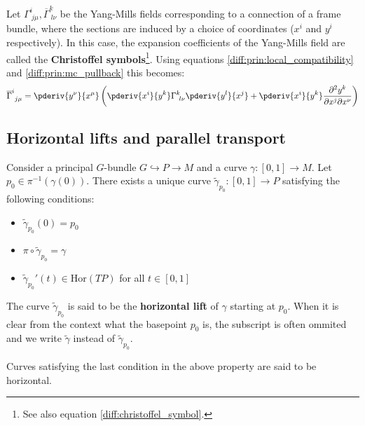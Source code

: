 	\begin{example}
		Let $\Gamma^i_{\ j\mu}, \overline{\Gamma}^k_{\ l\nu}$ be the Yang-Mills fields corresponding to a connection of a frame bundle, where the sections are induced by a choice of coordinates ($x^i$ and $y^i$ respectively). In this case, the expansion coefficients of the Yang-Mills field are called the \textbf{Christoffel symbols}\footnote{See also equation \ref{diff:christoffel_symbol}.}. Using equations \ref{diff:prin:local_compatibility} and \ref{diff:prin:mc_pullback} this becomes:
		\begin{equation}
			\overline{\Gamma}^i_{\ j\mu} = \pderiv{y^\nu}{x^\mu}\left(\pderiv{x^i}{y^k}\Gamma^k_{\ l\nu}\pderiv{y^l}{x^j} + \pderiv{x^i}{y^k}\frac{\partial^2y^k}{\partial x^j\partial x^\nu}\right)
		\end{equation}
	\end{example}

\subsection{Horizontal lifts and parallel transport}
	
	\begin{property}
		Consider a principal $G$-bundle $G\hookrightarrow P\rightarrow M$ and a curve $\gamma:[0, 1]\rightarrow M$. Let $p_0\in \pi^{-1}(\gamma(0))$. There exists a unique curve $\widetilde{\gamma}_{p_0}:[0, 1]\rightarrow P$ satisfying the following conditions:
		\begin{itemize}
			\item $\widetilde{\gamma}_{p_0}(0) = p_0$
			\item $\pi\circ\widetilde{\gamma}_{p_0} = \gamma$
			\item $\widetilde{\gamma}_{p_0}'(t)\in\text{Hor}(TP)$ for all $t\in[0, 1]$
		\end{itemize}
		The curve $\widetilde{\gamma}_{p_0}$ is said to be the \textbf{horizontal lift} of $\gamma$ starting at $p_0$. When it is clear from the context what the basepoint $p_0$ is, the subscript is often ommited and we write $\widetilde{\gamma}$ instead of $\widetilde{\gamma}_{p_0}$.
	\end{property}
	\begin{remark}
		Curves satisfying the last condition in the above property are said to be horizontal.
	\end{remark}
	
